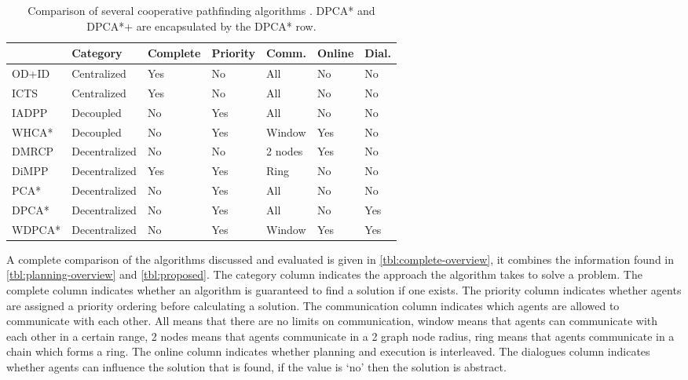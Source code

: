\begin{table*}
    \centering
    \caption{Comparison of several cooperative pathfinding algorithms 
        \cite{standley2010,standley2011,sharon2013,cap2012,silver2005,wei2016,chouhan2017}.
        DPCA* and DPCA*+ are encapsulated by the DPCA* row.}
    \label{tbl:complete-overview}
    \begin{tabular}{l|l|l|l|l|l|l}
        & Category & Complete & Priority & Comm. & Online & Dial. \\
        \hline
        OD+ID & Centralized & Yes & No &
        All & No & No \\
        ICTS & Centralized & Yes & No & All & No & No \\
        IADPP & Decoupled & No & Yes & All & No & No \\
        WHCA* & Decoupled & No & Yes & Window & Yes & No \\
        DMRCP & Decentralized & No & No & 2 nodes & Yes & No \\
        DiMPP & Decentralized & Yes & Yes & Ring & No & No \\
        \hline
        PCA* & Decentralized & No & Yes & All & No & No \\
        DPCA* & Decentralized & No & Yes & All & 
        No & Yes \\
        WDPCA* & Decentralized & No & Yes & Window & Yes & Yes
    \end{tabular}
\end{table*}

A complete comparison of the algorithms discussed and evaluated is given in 
\autoref{tbl:complete-overview}, it combines the information found in 
\autoref{tbl:planning-overview} and \autoref{tbl:proposed}. The category column 
indicates the approach the algorithm takes to solve a problem. The complete 
column indicates whether an algorithm is guaranteed to find a solution if one 
exists. The priority column indicates whether agents are assigned a priority 
ordering before calculating a solution. The communication column indicates 
which agents are allowed to communicate with each other. All means that there 
are no limits on communication, window means that agents can communicate with 
each other in a certain range, 2 nodes means that agents communicate in a 2 
graph node radius, ring means that agents communicate in a chain which forms a 
ring. The online column indicates whether planning and execution is 
interleaved. The dialogues column indicates whether agents can influence the 
solution that is found, if the value is `no' then the solution is abstract.


